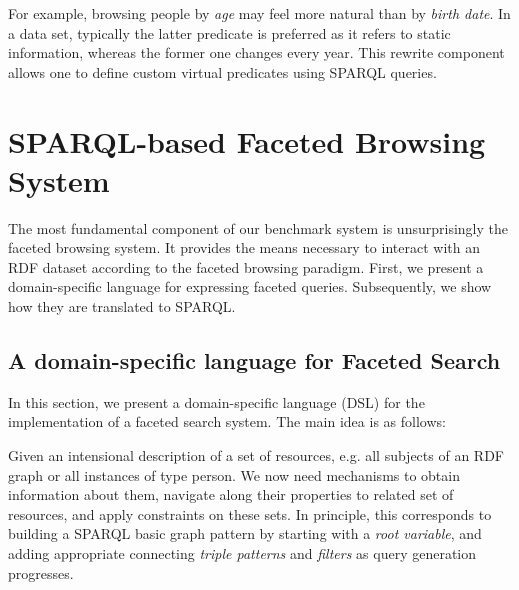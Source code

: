 \begin{itemize}
  For example, browsing people by \emph{age} may feel more natural than by \emph{birth date}. In a data set, typically the latter predicate is preferred as it refers to static information, whereas the former one changes every year. This rewrite component allows one to define custom virtual predicates using SPARQL queries.    
\end{itemize}


\section{SPARQL-based Faceted Browsing System}
\label{sec:engine}
The most fundamental component of our benchmark system is unsurprisingly the faceted browsing system.
It provides the means necessary to interact with an RDF dataset according to the faceted browsing paradigm.
First, we present a domain-specific language for expressing faceted queries. Subsequently, we show how they are translated to SPARQL.

\subsection{A domain-specific language for Faceted Search}
In this section, we present a domain-specific language (DSL) for the implementation of a faceted search system.
The main idea is as follows:

Given an intensional description of a set of resources, e.g. all subjects of an RDF graph or all instances of type person. We now need mechanisms to obtain information about them, navigate along their properties to related set of resources, and apply constraints on these sets. In principle, this corresponds to building a SPARQL basic graph pattern by starting with a \emph{root variable}, and adding appropriate connecting \emph{triple patterns} and \emph{filters} as query generation progresses.

